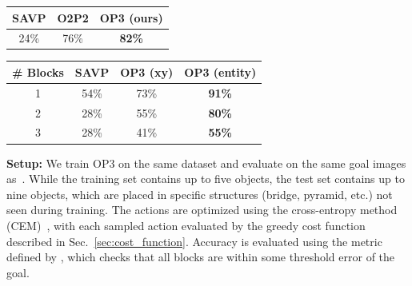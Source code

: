 \begin{minipage}{\textwidth}
\begin{minipage}[m]{.39\textwidth}
\footnotesize
    \centering
    \begin{tabular}{ccc}
    \toprule
    SAVP   &  O2P2 &  OP3 (ours)   \\
    \midrule
    24\% & 76\% & \textbf{82\%}\\
    \bottomrule
    \end{tabular}
    \centering
    \label{tab:mse_results}
\end{minipage}
 \hfill
\begin{minipage}[m]{.59\textwidth}
\footnotesize
\centering
            \begin{tabular}{c|ccc}
    \toprule
            \# Blocks & SAVP    &  OP3 (xy) & OP3 (entity) \\
         \midrule
              1 & 54\% & 73\% & \textbf{91\%}\\
              2 & 28\%  & 55\% & \textbf{80\%}\\
               3 & 28\%  & 41\% & \textbf{55\%}\\
    \bottomrule
    \end{tabular}
    \centering
    \label{tab:multistep_results}
\end{minipage}
\normalsize
\end{minipage}

\textbf{Setup:} We train OP3 on the same dataset and evaluate on the same goal images as~\citet{janner2018reasoning}.
While the training set contains up to five
objects, the test set contains up to nine objects, which are placed in specific structures (bridge, pyramid, etc.) not seen during training.
The actions are optimized using the cross-entropy method (CEM)~\citep{Rubinstein2004TheCM}, with each sampled action evaluated by the greedy cost function described in Sec.~\ref{sec:cost_function}.
Accuracy is evaluated using the metric defined by \citet{janner2018reasoning}, which checks that all blocks are within some threshold error of the goal.

